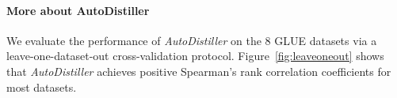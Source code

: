 \documentclass[11pt]{article}
\begin{document}

\paragraph{More about AutoDistiller} \label{sec:app:task_embedding}
We evaluate the performance of \emph{AutoDistiller} on the 8 GLUE datasets via a leave-one-dataset-out cross-validation protocol. Figure~\ref{fig:leaveoneout} shows that \emph{AutoDistiller} achieves positive Spearman's rank correlation coefficients for most datasets.
\end{document}
